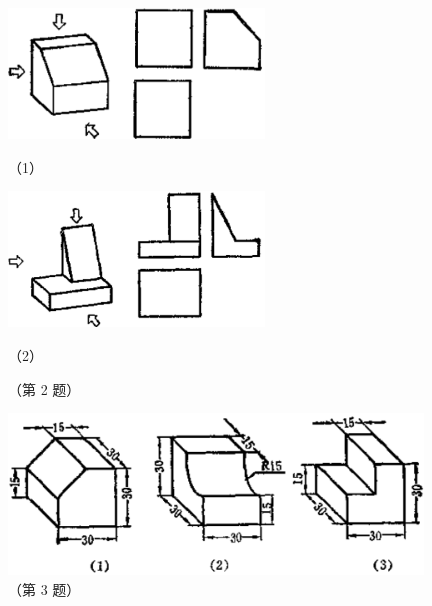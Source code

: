 \begin{lianxi}
\begin{figure}[htbp]
    \centering
    \begin{minipage}[b]{7cm}
        \centering
        \includegraphics[width=6.8cm]{../pic/czjh2-ch8-subsec3-lx-02-1.png}
        \caption*{（1）}
    \end{minipage}
    \qquad
    \begin{minipage}[b]{7cm}
        \centering
        \includegraphics[width=6.8cm]{../pic/czjh2-ch8-subsec3-lx-02-2.png}
        \caption*{（2）}
    \end{minipage}
    \caption*{（第 2 题）}
\end{figure}



\begin{figure}[htbp]
    \centering
    \includegraphics[width=11cm]{../pic/czjh2-ch8-subsec3-lx-03.png}
    \caption*{（第 3 题）}
\end{figure}

\end{lianxi}